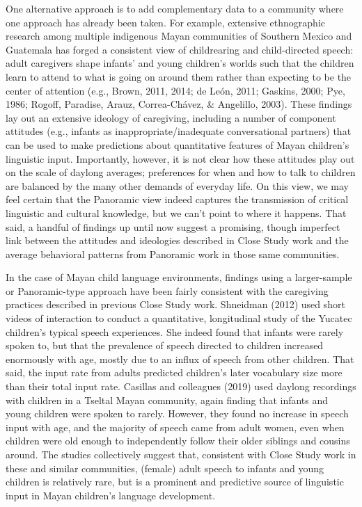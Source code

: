 \documentclass[,man,mask,floatsintext]{apa6}
\begin{document}
One alternative approach is to add complementary data to a community
where one approach has already been taken. For example, extensive
ethnographic research among multiple indigenous Mayan communities of
Southern Mexico and Guatemala has forged a consistent view of
childrearing and child-directed speech: adult caregivers shape infants'
and young children's worlds such that the children learn to attend to
what is going on around them rather than expecting to be the center of
attention (e.g., Brown, 2011, 2014; de León, 2011; Gaskins, 2000; Pye,
1986; Rogoff, Paradise, Arauz, Correa-Chávez, \& Angelillo, 2003). These
findings lay out an extensive ideology of caregiving, including a number
of component attitudes (e.g., infants as inappropriate/inadequate
conversational partners) that can be used to make predictions about
quantitative features of Mayan children's linguistic input. Importantly,
however, it is not clear how these attitudes play out on the scale of
daylong averages; preferences for when and how to talk to children are
balanced by the many other demands of everyday life. On this view, we
may feel certain that the Panoramic view indeed captures the
transmission of critical linguistic and cultural knowledge, but we can't
point to where it happens. That said, a handful of findings up until now
suggest a promising, though imperfect link between the attitudes and
ideologies described in Close Study work and the average behavioral
patterns from Panoramic work in those same communities.

In the case of Mayan child language environments, findings using a
larger-sample or Panoramic-type approach have been fairly consistent
with the caregiving practices described in previous Close Study work.
Shneidman (2012) used short videos of interaction to conduct a
quantitative, longitudinal study of the Yucatec children's typical
speech experiences. She indeed found that infants were rarely spoken to,
but that the prevalence of speech directed to children increased
enormously with age, mostly due to an influx of speech from other
children. That said, the input rate from adults predicted children's
later vocabulary size more than their total input rate. Casillas and
colleagues (2019) used daylong recordings with children in a Tseltal
Mayan community, again finding that infants and young children were
spoken to rarely. However, they found no increase in speech input with
age, and the majority of speech came from adult women, even when
children were old enough to independently follow their older siblings
and cousins around. The studies collectively suggest that, consistent
with Close Study work in these and similar communities, (female) adult
speech to infants and young children is relatively rare, but is a
prominent and predictive source of linguistic input in Mayan children's
language development.
\end{document}
